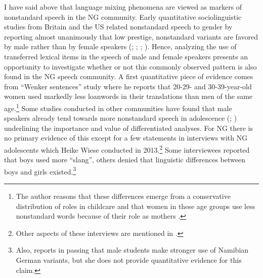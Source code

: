 \documentclass[output=paper]{langsci/langscibook}
\begin{document}
I have said above that language mixing phenomena are viewed as markers of nonstandard speech in the NG community. Early quantitative sociolinguistic studies from Britain and the US related nonstandard speech to gender by reporting almost unanimously that low prestige, nonstandard variants are favored by male rather than by female speakers (\citealt{labov_social_2006}; \citealt{wolfram_sociolinguistic_1969}; \citealt{trudgill_sex_1972}; \citealt{macaulay_language_1977}). Hence, analyzing the use of transferred lexical items in the speech of male and female speakers presents an opportunity to investigate whether or not this commonly observed pattern is also found in the NG speech community. A first quantitative piece of evidence comes from  “Wenker sentences” study where he reports that 20-29- and 30-39-year-old women used markedly less loanwords in their translations than men of the same age.\footnote{The author reasons that these differences emerge from a conservative distribution of roles in childcare and that women in these age groups use less nonstandard words because of their role as mothers \citep{zimmer_linguisticvar_toappear}.} Some studies conducted in other communities have found that male speakers already tend towards more nonstandard speech in adolescence (\citealt{eisikovitz_girl_2011}; \citealt[387]{eckert_language_2003}) underlining the importance and value of differentiated analyses. For NG there is no primary evidence of this except for a few statements in interviews with NG adolescents which Heike Wiese conducted in 2013.\footnote{Other aspects of these interviews are mentioned in \citealt{wiese_german_2017}.} Some interviewees reported that boys used more “slang”, others denied that linguistic differences between boys and girls existed.\footnote{Also, \citet[359]{deumert_namibian_2009} reports in passing that male students make stronger use of Namibian German variants, but she does not provide quantitative evidence for this claim.}
\end{document}
